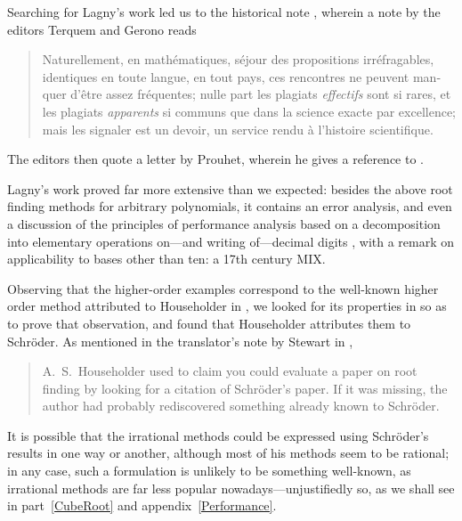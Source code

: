 ﻿\documentclass[10pt, a4paper, twoside]{basestyle}
\begin{document}
Searching for Lagny’s work led us to the historical note \cite{Cantor1861}, wherein a note by the editors Terquem and Gerono reads
\begin{quote}\textfrench{%
Naturellement, en mathématiques, séjour des propositions irréfragables, identiques en toute langue, en tout pays, ces rencontres ne peuvent manquer d'être assez fréquentes; nulle part les plagiats \emph{effectifs} sont si rares, et les plagiats \emph{apparents} si communs que dans la science exacte par excellence; mais les signaler est un devoir, un service rendu à l'histoire scientifique.}
\end{quote}
The editors then quote a letter by Prouhet, wherein he gives a reference to \cite{FantetdeLagny1692}.

Lagny’s work proved far more extensive than we expected: besides the above root finding methods for arbitrary
polynomials, it contains an error analysis, and even a discussion of the principles of performance analysis based on a decomposition into elementary operations on---and
writing of---decimal digits \cite[5--9]{FantetdeLagny1692}, with a remark on applicability
to bases other than ten: a 17th century MIX.

Observing that the higher-order examples correspond to the well-known higher order
method attributed to Householder in \cite{SebahGourdon2001}, we looked for its properties in \cite{Householder1970} so as to prove that observation, and found that Householder attributes
them to Schröder.
As mentioned in the translator’s note by Stewart in \cite{SchröderStewart1993},
\begin{quote}
A.~S.~Householder used to claim you could evaluate a paper on
root finding by looking for a citation of Schröder’s paper. If it was
missing, the author had probably rediscovered something already
known to Schröder.
\end{quote}
It is possible that the irrational methods could be expressed using Schröder’s results in one way or another, although most of his methods seem to be rational; in any case, such a formulation
is unlikely to be something well-known, as irrational methods are far less popular
nowadays---unjustifiedly so, as we shall see in part~\ref{CubeRoot} and appendix~\ref{Performance}.
\end{document}
